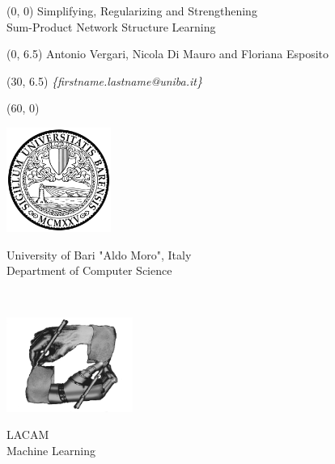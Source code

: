 \documentclass[final]{beamer}
\begin{document}
\begin{frame}{}
  \begin{textblock}{58}(0, 0)
    \huge
    Simplifying, Regularizing and Strengthening\\
    Sum-Product Network Structure Learning
  \end{textblock}
  \begin{textblock}{30}(0, 6.5)
    \small
    Antonio  Vergari, Nicola  {Di Mauro} and Floriana Esposito
  \end{textblock}
  \begin{textblock}{15}(30, 6.5)
    \small
    \emph{\{firstname.lastname@uniba.it\}}
  \end{textblock}
  \begin{textblock}{30}(60, 0)
    \footnotesize
    \begin{minipage}[t]{5cm}
      \vspace{0pt}\hspace{5pt}
      \includegraphics[width=97pt]{figures/unibaba}
    \end{minipage}
    \begin{minipage}[t]{15cm}
    \vspace{27pt}
      \flushleft
      University of Bari "Aldo Moro", Italy\\
    \vspace{2pt}
      Department of Computer Science
    \end{minipage}\\[0.75cm]
    \footnotesize
    \begin{minipage}[t]{5cm}
      \vspace{0pt}
      \includegraphics[width=117pt]{figures/lacam}
    \end{minipage}
    \begin{minipage}[t]{15cm}
      \vspace{23pt}
      \flushleft
      LACAM\\
      \vspace{2pt}
      Machine Learning
    \end{minipage}
  \end{textblock}
  

\end{frame}
\end{document}
